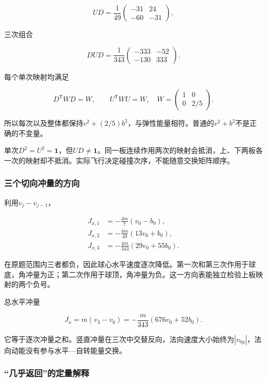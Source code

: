 \documentclass[12pt,a4paper,fontset=fandol]{ctexart}
\begin{document}
\[
UD=\frac1{49}\begin{pmatrix}-31&24\\-60&-31\end{pmatrix},
\]

三次组合

\[
DUD=\frac1{343}
\begin{pmatrix}-333&-52\\-130&333\end{pmatrix}.
\]

每个单次映射均满足

\[
D^{\mathsf T}WD=W,\qquad
U^{\mathsf T}WU=W,\quad
W=\begin{pmatrix}1&0\\0&2/5\end{pmatrix}.
\]

所以每次以及整体都保持\(v^2+(2/5)b^2\)，与弹性能量相符。普通的\(v^2+b^2\)不是正确的不变量。

单次\(D^2=U^2=\mathbf1\)，但\(UD\neq\mathbf1\)。同一板连续作用两次的映射会抵消，上、下两板各一次的映射却不抵消。实际飞行决定碰撞次序，不能随意交换矩阵顺序。

\subsubsection{三个切向冲量的方向}\label{ux4e09ux4e2aux5207ux5411ux51b2ux91cfux7684ux65b9ux5411}

利用\(v_j-v_{j-1}\)，

\[
\begin{aligned}
J_{x,1}&=-\frac{4m}{7}(v_0-b_0),\\
J_{x,2}&=-\frac{4m}{49}(13v_0+b_0),\\
J_{x,3}&=-\frac{4m}{343}(29v_0+55b_0).
\end{aligned}
\]

在原题范围内三者都负，因此球心水平速度逐次降低。第一次和第三次作用于球底，角冲量为正；第二次作用于球顶，角冲量为负。这一方向表能独立检验上板映射的两个负号。

总水平冲量

\[
J_x=m(v_3-v_0)
=-\frac{m}{343}(676v_0+52b_0).
\]

它等于逐次冲量之和。竖直冲量在三次中交替反向，法向速度大小始终为\(|v_{0y}|\)，法向动能没有参与水平---自转能量交换。

\subsubsection{``几乎返回''的定量解释}\label{ux51e0ux4e4eux8fd4ux56deux7684ux5b9aux91cfux89e3ux91ca}
\end{document}
